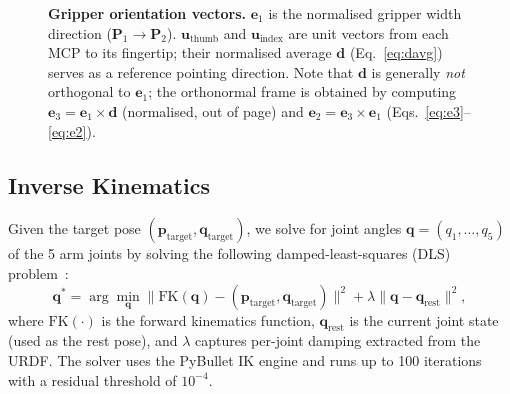 \documentclass{ieeeaccess}
\newcommand{\vect}[1]{\mathbf{#1}}
\begin{document}
\begin{figure}[t]
\caption{\textbf{Gripper orientation vectors.}
  $\vect{e}_1$ is the normalised gripper width direction
  ($\vect{P}_1 \to \vect{P}_2$).
  $\vect{u}_{\text{thumb}}$ and $\vect{u}_{\text{index}}$ are unit
  vectors from each MCP to its fingertip; their normalised average
  $\vect{d}$ (Eq.~\ref{eq:davg}) serves as a reference pointing
  direction. Note that $\vect{d}$ is generally \emph{not} orthogonal
  to $\vect{e}_1$; the orthonormal frame is obtained by computing
  $\vect{e}_3 = \vect{e}_1 \times \vect{d}$ (normalised, out of page)
  and $\vect{e}_2 = \vect{e}_3 \times \vect{e}_1$
  (Eqs.~\ref{eq:e3}--\ref{eq:e2}).}
\label{fig:gripper_vectors}
\end{figure}

\subsection{Inverse Kinematics}
\label{sec:ik}

Given the target pose $(\vect{p}_{\text{target}},
\vect{q}_{\text{target}})$, we solve for joint angles
$\vect{q} = (q_1, \ldots, q_5)$ of the 5 arm joints
by solving the following damped-least-squares (DLS)
problem~\cite{wampler1986dls}:
\begin{equation}\label{eq:ik}
  \vect{q}^* = \arg\min_{\vect{q}}
  \bigl\|
    \text{FK}(\vect{q}) - (\vect{p}_{\text{target}},
                                  \vect{q}_{\text{target}})
  \bigr\|^2
  + \lambda \|\vect{q} - \vect{q}_{\text{rest}}\|^2,
\end{equation}
where $\text{FK}(\cdot)$ is the forward kinematics function,
$\vect{q}_{\text{rest}}$ is the current joint state (used as the
rest pose), and $\lambda$ captures per-joint damping extracted from the
URDF. The solver uses the PyBullet IK engine and runs up to 100
iterations with a residual threshold of $10^{-4}$.
\end{document}
